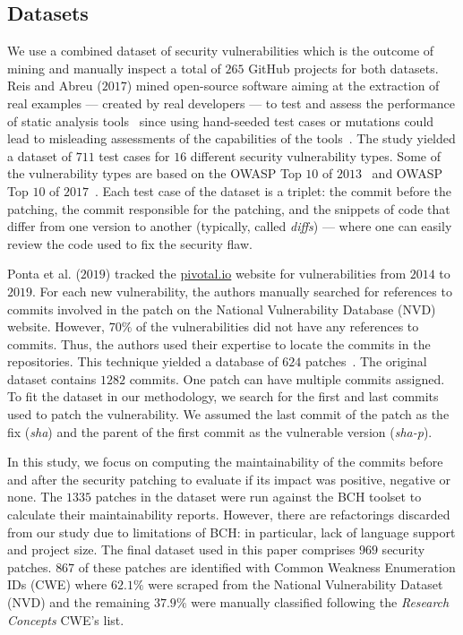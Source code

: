 \documentclass[10pt,conference]{IEEEtran}
\begin{document}
\subsection{Datasets}
%
We use a combined dataset of security vulnerabilities which is 
the outcome of mining and manually inspect a total of $265$ GitHub projects for both
datasets. Reis and Abreu 
($2017$) mined open-source
software aiming at the extraction of real examples --- created by real
developers --- to test and assess the performance of static analysis tools~\cite{Reis:2017:IJSSE} since
using hand-seeded test cases or mutations could lead to misleading assessments
of the capabilities of the tools~\cite{just2014mutants}. The study yielded a
dataset of $711$ test cases for $16$ different security vulnerability types. Some of the vulnerability types
are based on the OWASP Top $10$ of $2013$~\cite{oswap:2013} and OWASP Top $10$ of
$2017$~\cite{oswap:2017}. Each test case of the
dataset is a triplet: the commit before the patching, the commit responsible
for the patching, and the snippets of code that differ from one version to
another (typically, called \textit{diffs}) --- where one can easily review the
code used to fix the security flaw. 
%

Ponta et al. ($2019$) tracked the \url{pivotal.io} website for vulnerabilities 
from $2014$ to $2019$. For each new vulnerability, the authors manually searched 
for references to commits involved in the patch on the National Vulnerability 
Database (NVD) website. However, $70\%$
of the vulnerabilities did not have any references to commits. Thus, the authors
used their expertise to locate the commits in the repositories. This technique 
yielded a database of $624$ patches~\cite{10.1109/MSR.2019.00064}. The original 
dataset contains $1282$ commits. One patch can have multiple commits assigned.
To fit the dataset in our methodology, we search for the first and last commits
used to patch the vulnerability. We assumed the last commit of the patch as 
the fix (\emph{sha}) and the parent of the first commit as the vulnerable version 
(\emph{sha-p}).
%

In this study, we focus on computing the
maintainability of the commits before and after the security patching to
evaluate if its impact was positive, negative or none.
The $1335$ patches in the dataset were run against the BCH toolset to
calculate their maintainability reports. However, there are refactorings
discarded from our study due to limitations of BCH: in particular, lack of
language support and project size. The final dataset used in this paper comprises
$969$ security patches. $867$ of these patches are identified with Common Weakness
Enumeration IDs (CWE) where $62.1\%$ were scraped from the National Vulnerability 
Dataset (NVD) and the remaining $37.9\%$ were manually classified following the 
\emph{Research Concepts} CWE's list.
\end{document}

